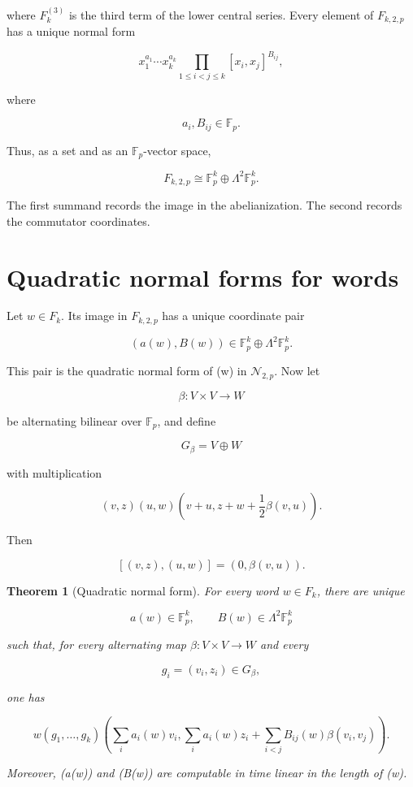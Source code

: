 \documentclass[11pt]{article}
\newtheorem{theorem}{Theorem}[section]
\begin{document}
where $F_k^{(3)}$ is the third term of the lower central series. Every element of $F_{k,2,p}$ has a unique normal form

\[
x_1^{a_1}\cdots x_k^{a_k}
\prod_{1\le i<j\le k}[x_i,x_j]^{B_{ij}},
\]

where

\[
a_i,B_{ij}\in\mathbb F_p.
\]

Thus, as a set and as an $\mathbb F_p$-vector space,

\[
F_{k,2,p}\cong \mathbb F_p^k\oplus\Lambda^2\mathbb F_p^k.
\]

The first summand records the image in the abelianization. The second records the commutator coordinates.

\section{Quadratic normal forms for words}

Let $w\in F_k$. Its image in $F_{k,2,p}$ has a unique coordinate pair

\[
(a(w),B(w))\in
\mathbb F_p^k\oplus\Lambda^2\mathbb F_p^k.
\]

This pair is the quadratic normal form of (w) in $\mathcal N_{2,p}$. Now let

\[
\beta:V\times V\to W
\]

be alternating bilinear over $\mathbb F_p$, and define

\[
G_\beta=V\oplus W
\]

with multiplication

\[
(v,z)(u,w)
\left(
v+u,
z+w+\frac12\beta(v,u)
\right).
\]

Then

\[
[(v,z),(u,w)]=(0,\beta(v,u)).
\]

\begin{theorem}[Quadratic normal form]
For every word $w\in F_k$, there are unique

\[
a(w)\in\mathbb F_p^k,
\qquad
B(w)\in\Lambda^2\mathbb F_p^k
\]

such that, for every alternating map $\beta:V\times V\to W$ and every

\[
g_i=(v_i,z_i)\in G_\beta,
\]

one has

\[
w(g_1,\dots,g_k)
\left(
\sum_i a_i(w)v_i,
\sum_i a_i(w)z_i+
\sum_{i<j}B_{ij}(w)\beta(v_i,v_j)
\right).
\]

Moreover, (a(w)) and (B(w)) are computable in time linear in the length of (w).

\end{theorem}
\end{document}
